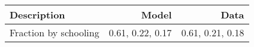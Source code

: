 \begin{tabular}{lrr}
\hline
Description & Model  & Data  \\ 
\hline
Fraction by schooling & 0.61, 0.22, 0.17  & 0.61, 0.21, 0.18  \\ 
\hline
\end{tabular}%
